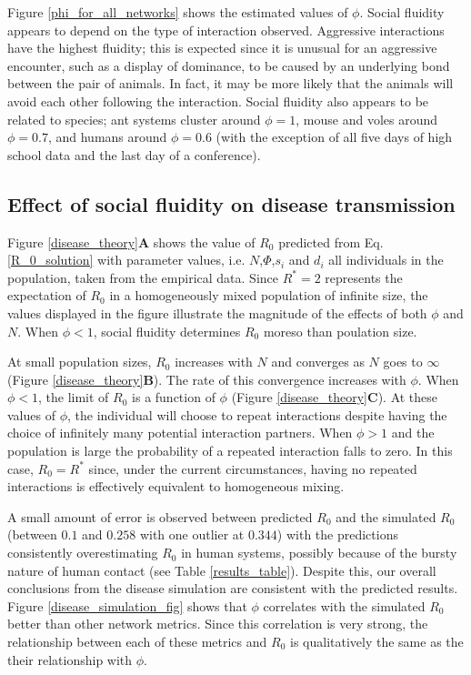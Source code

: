 \documentclass[10pt]{article}
\begin{document}
\begin{multicols}{2}
Figure \ref{phi_for_all_networks} shows the estimated values of $\phi$. Social fluidity appears to depend on the type of interaction observed. Aggressive interactions have the highest fluidity; this is expected since it is unusual for an aggressive encounter, such as a display of dominance, to be caused by an underlying bond between the pair of animals. In fact, it may be more likely that the animals will avoid each other following the interaction. Social fluidity also appears to be related to species; ant systems cluster around $\phi=1$, mouse and voles around $\phi=0.7$, and humans around $\phi=0.6$ (with the exception of all five days of high school data and the last day of a conference).

\subsection{Effect of social fluidity on disease transmission}
Figure \ref{disease_theory}\textbf{A} shows the value of $R_{0}$ predicted from Eq.\eqref{R_0_solution} with parameter values, i.e. $N$,$\Phi$,$s_{i}$ and $d_{i}$ all individuals in the population, taken from the empirical data. Since $R^{*}=2$ represents the expectation of $R_{0}$ in a homogeneously mixed population of infinite size, the values displayed in the figure illustrate the magnitude of the effects of both $\phi$ and $N$. When $\phi<1$, social fluidity determines $R_{0}$ moreso than poulation size.  

At small population sizes, $R_{0}$ increases with $N$ and converges as $N$ goes to $\infty$ (Figure \ref{disease_theory}\textbf{B}). The rate of this convergence increases with $\phi$. When $\phi<1$, the limit of $R_{0}$ is a function of $\phi$ (Figure \ref{disease_theory}\textbf{C}). At these values of $\phi$, the individual will choose to repeat interactions despite having the choice of infinitely many potential interaction partners. When $\phi>1$ and the population is large the probability of a repeated interaction falls to zero. In this case, $R_{0}=R^{*}$ since, under the current circumstances, having no repeated interactions is effectively equivalent to homogeneous mixing.

A small amount of error is observed between predicted $R_{0}$ and the simulated $R_{0}$ (between $0.1$ and $0.258$ with one outlier at $0.344$) with the predictions consistently overestimating $R_{0}$ in human systems, possibly because of the bursty nature of human contact (see Table \ref{results_table}). Despite this, our overall conclusions from the disease simulation are consistent with the predicted results. Figure \ref{disease_simulation_fig} shows that $\phi$ correlates with the simulated $R_{0}$ better than other network metrics. Since this correlation is very strong, the relationship between each of these metrics and $R_{0}$ is qualitatively the same as the their relationship with $\phi$. 


\end{multicols}
\end{document}
